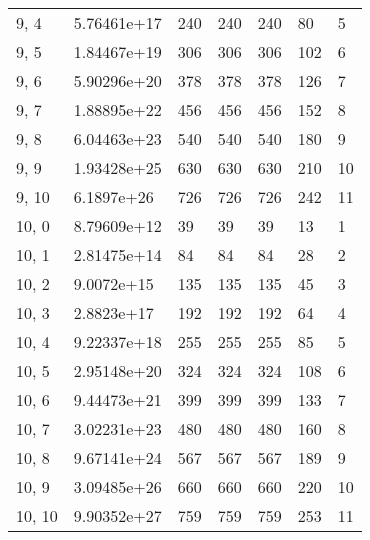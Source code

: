 \begin{table}
\begin{tabular}{lllllll}
9, 4   &  5.76461e+17 &         240 &       240 &         240 &       80 &     5 \\
9, 5   &  1.84467e+19 &         306 &       306 &         306 &      102 &     6 \\
9, 6   &  5.90296e+20 &         378 &       378 &         378 &      126 &     7 \\
9, 7   &  1.88895e+22 &         456 &       456 &         456 &      152 &     8 \\
9, 8   &  6.04463e+23 &         540 &       540 &         540 &      180 &     9 \\
9, 9   &  1.93428e+25 &         630 &       630 &         630 &      210 &    10 \\
9, 10  &   6.1897e+26 &         726 &       726 &         726 &      242 &    11 \\
10, 0  &  8.79609e+12 &          39 &        39 &          39 &       13 &     1 \\
10, 1  &  2.81475e+14 &          84 &        84 &          84 &       28 &     2 \\
10, 2  &   9.0072e+15 &         135 &       135 &         135 &       45 &     3 \\
10, 3  &   2.8823e+17 &         192 &       192 &         192 &       64 &     4 \\
10, 4  &  9.22337e+18 &         255 &       255 &         255 &       85 &     5 \\
10, 5  &  2.95148e+20 &         324 &       324 &         324 &      108 &     6 \\
10, 6  &  9.44473e+21 &         399 &       399 &         399 &      133 &     7 \\
10, 7  &  3.02231e+23 &         480 &       480 &         480 &      160 &     8 \\
10, 8  &  9.67141e+24 &         567 &       567 &         567 &      189 &     9 \\
10, 9  &  3.09485e+26 &         660 &       660 &         660 &      220 &    10 \\
10, 10 &  9.90352e+27 &         759 &       759 &         759 &      253 &    11 \\
\bottomrule
\end{tabular}
\end{table}
